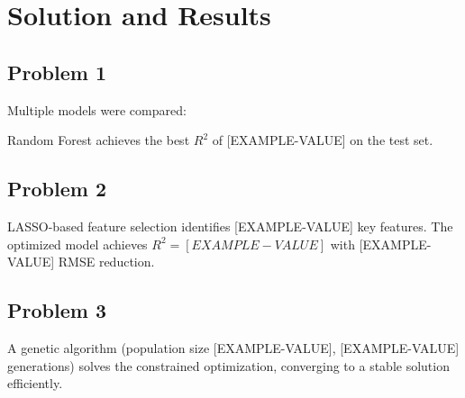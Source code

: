 \section{Solution and Results}

\subsection{Problem 1}

Multiple models were compared:


Random Forest achieves the best $R^2$ of [EXAMPLE-VALUE] on the test set.

\subsection{Problem 2}

LASSO-based feature selection identifies [EXAMPLE-VALUE] key features. The optimized model achieves $R^2 = [EXAMPLE-VALUE]$ with [EXAMPLE-VALUE] RMSE reduction.

\subsection{Problem 3}

A genetic algorithm (population size [EXAMPLE-VALUE], [EXAMPLE-VALUE] generations) solves the constrained optimization, converging to a stable solution efficiently.
